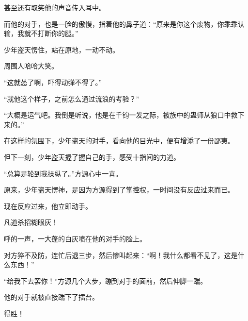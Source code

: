 \begin{this_body}
甚至还有取笑他的声音传入耳中。

而他的对手，也是一脸的傲慢，指着他的鼻子道：“原来是你这个废物，你乖乖认输，我就不打断你的腿。”

少年盗天愣住，站在原地，一动不动。

周围人哈哈大笑。

“这就怂了啊，吓得动弹不得了。”

“就他这个样子，之前怎么通过流浪的考验？”

“大概是运气吧。我倒是听说，他是在千钧一发之际，被族中的蛊师从狼口中救下来的。”

在这样的氛围下，少年盗天的对手，看向他的目光中，便有增添了一份鄙夷。

但下一刻，少年盗天握了握自己的手，感受十指间的力道。

“总算是轮到我操纵了。”方源心中一喜。

原来，少年盗天愣神，是因为方源得到了掌控权，一时间没有反应过来而已。

现在反应过来，他立即动手。

凡道杀招糊眼灰！

呼的一声，一大蓬的白灰喷在他的对手的脸上。

对方猝不及防，连忙后退三步，然后惨叫起来：“啊！我什么都看不见了，这是什么东西！”

“给我下去罢你！”方源几个大步，蹦到对手的面前，然后伸脚一踹。

他的对手就被直接踹下了擂台。

得胜！

\end{this_body}


